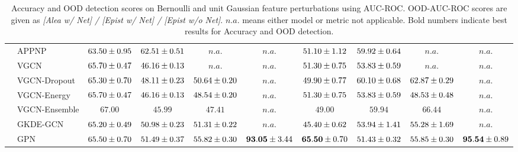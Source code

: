 \begin{table*}[!h]
{\begin{tabular}{ll|cccc|cccc}
        \midrule
        
        & APPNP & ${63.50\tiny \pm 0.95}$ & ${{62.51}\tiny \pm 0.51}$ & $n.a.$ & $n.a.$ & ${51.10\tiny \pm 1.12}$ & ${59.92\tiny \pm 0.64}$ & $n.a.$ & $n.a.$\\
        & VGCN & ${65.70\tiny \pm 0.47}$ & ${46.16\tiny \pm 0.13}$ & $n.a.$ & $n.a.$ & ${51.30\tiny \pm 0.75}$ & ${53.83\tiny \pm 0.59}$ & $n.a.$ & $n.a.$\\
        & VGCN-Dropout & ${65.30\tiny \pm 0.70}$ & ${48.11\tiny \pm 0.23}$ & ${50.64\tiny \pm 0.20}$ & $n.a.$ & ${49.90\tiny \pm 0.77}$ & ${{60.10}\tiny \pm 0.68}$ & ${62.87\tiny \pm 0.29}$ & $n.a.$\\
        & VGCN-Energy & ${65.70\tiny \pm 0.47}$ & ${46.16\tiny \pm 0.13}$ & ${48.54\tiny \pm 0.20}$ & $n.a.$ & ${51.30\tiny \pm 0.75}$ & ${53.83\tiny \pm 0.59}$ & ${48.53\tiny \pm 0.48}$ & $n.a.$\\
        & VGCN-Ensemble & ${\mathbf{67.00}}$ & ${45.99}$ & ${47.41}$ & $n.a.$ & ${49.00}$ & ${59.94}$ & ${{66.44}}$ & $n.a.$\\
        & GKDE-GCN & ${65.20\tiny \pm 0.49}$ & ${50.98\tiny \pm 0.23}$ & ${51.31\tiny \pm 0.22}$ & $n.a.$ & ${45.40\tiny \pm 0.62}$ & ${53.94\tiny \pm 1.41}$ & ${55.28\tiny \pm 1.69}$ & $n.a.$\\
        & GPN & ${65.50\tiny \pm 0.70}$ & ${51.49\tiny \pm 0.37}$ & ${{55.82}\tiny \pm 0.30}$ & ${\mathbf{93.05}\tiny \pm 3.44}$ & ${\mathbf{65.50}\tiny \pm 0.70}$ & ${51.43\tiny \pm 0.32}$ & ${55.85\tiny \pm 0.30}$ & ${\mathbf{95.54}\tiny \pm 0.89}$\\

        \bottomrule
    \end{tabular}}
    \caption{Accuracy and OOD detection scores on Bernoulli and unit Gaussian feature perturbations using AUC-ROC. OOD-AUC-ROC scores are given as \emph{[Alea w/ Net] / [Epist w/ Net] / [Epist w/o Net]}. $n.a.$ means either model or metric not applicable. Bold numbers indicate best results for Accuracy and  OOD detection.}
    \label{tab:isolated_auroc}
\end{table*}






